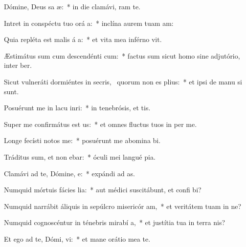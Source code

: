 \item Dómine, Deus sa æ:~* in die clamávi,   ram te.
\item Intret in conspéctu tuo orá a:~* inclína aurem tuam   am:
\item Quia repléta est malis á a:~* et vita mea inférno vit.
\item Æstimátus sum cum descendénti  cum:~* factus sum sicut homo sine adjutório, inter  ber.
\item Sicut vulneráti dormiéntes in secris,~\pscross{} quorum non es  plius:~* et ipsi de manu  si sunt.
\item Posuérunt me in lacu inri:~* in tenebrósis, et   tis.
\item Super me confirmátus est  us:~* et omnes fluctus tuos in per me.
\item Longe fecísti notos   me:~* posuérunt me abomina bi.
\item Tráditus sum, et non ebar:~* óculi mei langué  pia.
\item Clamávi ad te, Dómine,  e:~* expándi ad   as.
\item Numquid mórtuis fácies lia:~* aut médici suscitábunt, et confi bi?
\item Numquid narrábit áliquis in sepúlcro misericór am,~* et veritátem tuam in ne?
\item Numquid cognoscéntur in ténebris mirabí a,~* et justítia tua in terra nis?
\item Et ego ad te, Dómi, vi:~* et mane orátio mea  te.
